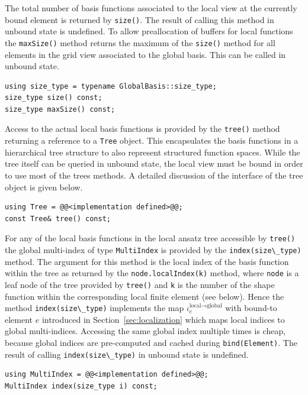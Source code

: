 \documentclass[a4paper,10pt,headings=normal,bibliography=totoc]{scrartcl}
\newcommand{\cpp}[1]{\lstinline[basicstyle=\ttfamily]!#1!}
\begin{document}
The total number of basis functions associated to the
local view at the currently bound element is returned
by \cpp{size()}. The result of calling this method in
unbound state is undefined.
To allow preallocation of buffers for local functions
the \cpp{maxSize()} method returns the maximum of the
\cpp{size()} method for all elements in the grid view
associated to the global basis. This can be called in
unbound state.

\begin{lstlisting}[style=Interface]
using size_type = typename GlobalBasis::size_type;
size_type size() const;
size_type maxSize() const;
\end{lstlisting}

Access to the actual local basis functions is provided
by the \cpp{tree()} method returning a reference to a
\cpp{Tree} object. This encapsulates the basis functions
in a hierarchical tree structure to also represent structured
function spaces.
While the tree  itself can be queried in unbound state,
the local view must be bound in order to use most of the
trees methods.
A detailed discussion of the interface of the tree object is
given below.

\begin{lstlisting}[style=Interface]
using Tree = @@<implementation defined>@@;
const Tree& tree() const;
\end{lstlisting}

For any of the local basis functions in the local ansatz tree
accessible by \cpp{tree()} the global
multi-index of type \cpp{MultiIndex}
is provided by the \cpp{index(size\_type)} method.
The argument for this method is the local
index of the basis function within the tree as
returned by the \cpp{node.localIndex(k)}
method, where \cpp{node} is a leaf node of the
tree provided by \cpp{tree()} and \cpp{k}
is the number of the shape function within the corresponding
local finite element (see below).
Hence the method \cpp{index(size\_type)}
implements the map $\iota^{\text{local}\to\text{global}}_e$
with bound-to element $e$
introduced in Section~\ref{sec:localization}
which maps local indices to global multi-indices.
Accessing the same global index multiple times
is cheap, because global indices are pre-computed
and cached during \cpp{bind(Element)}.
The result of calling \cpp{index(size\_type)} in
unbound state is undefined.

\begin{lstlisting}[style=Interface]
using MultiIndex = @@<implementation defined>@@;
MultiIndex index(size_type i) const;
\end{lstlisting}
\end{document}
